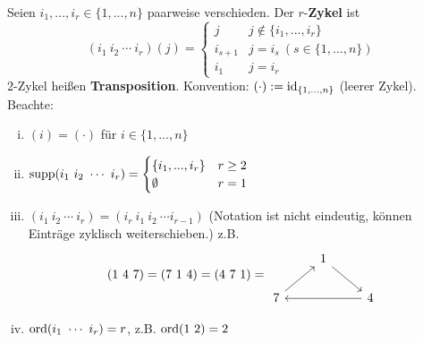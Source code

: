 \documentclass[a4paper]{report}
\begin{document}
\begin{defi}
  Seien $i_{1}, ..., i_{r} \in \{1, ..., n\}$ paarweise verschieden. Der $r$-\textbf{Zykel} ist \[(i_{1} \ i_{2}\ \cdots \ i_{r})(j) =
  \begin{cases}
    j & j \notin \{i_{1}, ..., i_{r}\} \\
    i_{s+1} & j = i_{s} \ (s \in \{1, ..., n\}) \\
    i_{1} & j = i_{r}
  \end{cases}\]
$2$-Zykel heißen \textbf{Transposition}.
Konvention: $( \cdot ):= \operatorname{id}_{\{1, ..., n\}}$ (leerer Zykel).
Beachte:
\begin{enumerate}[(i)]
  \item $(i) = (\cdot)$ für $i \in \{1, ..., n\}$
  \item $\operatorname{supp}(i_{1} \ i_{2} \ \cdots \ i_{r}) =
        \begin{cases}
          \{i_{1}, ..., i_{r}\} & r \ge 2 \\
          \emptyset & r =1
        \end{cases}$
  \item $(i_{1} \ i_{2}\ \cdots \ i_{r}) = (i_{r} \ i_{1} \ i_{2} \ \cdots i_{r-1})$ (Notation ist nicht eindeutig, können Einträge zyklisch weiterschieben.)
        z.B.
        \[(1 \ 4\ 7) = (7\ 1\ 4) = (4\ 7\ 1)
= \begin{tikzcd}
             & 1 \arrow[rd] &              \\
7 \arrow[ru] &              & 4 \arrow[ll]
\end{tikzcd}
        \]
  \item $\operatorname{ord}(i_{1}\ \cdots \ i_{r}) = r$, z.B. $\operatorname{ord}(1 \ 2) = 2$
\end{enumerate}
\end{defi}
\end{document}
